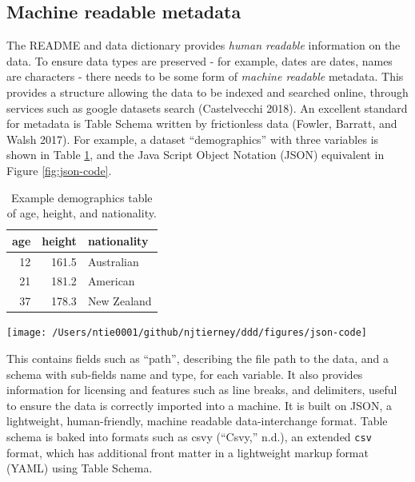 \documentclass[
]{article}
\let\origfigure\figure
\let\endorigfigure\endfigure
\renewenvironment{figure}[1][2] {
    \expandafter\origfigure\expandafter[H]
} {
    \endorigfigure
}
\begin{document}
\hypertarget{machine-metadata}{%
\subsection{Machine readable metadata}\label{machine-metadata}}

The README and data dictionary provides \emph{human readable} information on the data. To ensure data types are preserved - for example, dates are dates, names are characters - there needs to be some form of \emph{machine readable} metadata. This provides a structure allowing the data to be indexed and searched online, through services such as google datasets search (Castelvecchi 2018). An excellent standard for metadata is Table Schema written by frictionless data (Fowler, Barratt, and Walsh 2017). For example, a dataset ``demographics'' with three variables is shown in Table \ref{tab:table-machine-readable}, and the Java Script Object Notation (JSON) equivalent in Figure \ref{fig:json-code}.

\begin{table}[!h]

\caption{\label{tab:table-machine-readable}Example demographics table of age, height, and nationality.}
\centering
\begin{tabular}[t]{rrl}
\toprule
age & height & nationality\\
\midrule
12 & 161.5 & Australian\\
21 & 181.2 & American\\
37 & 178.3 & New Zealand\\
\bottomrule
\end{tabular}
\end{table}

\begin{figure}

{\centering \texttt{[image: /Users/ntie0001/github/njtierney/ddd/figures/json-code]} 

}

\caption{Example snippet of some Table Schema data for a dataset with three variables. This provides a description of each field, and the type of field.}\label{fig:json-code}
\end{figure}

This contains fields such as ``path'', describing the file path to the data, and a schema with sub-fields name and type, for each variable. It also provides information for licensing and features such as line breaks, and delimiters, useful to ensure the data is correctly imported into a machine. It is built on JSON, a lightweight, human-friendly, machine readable data-interchange format. Table schema is baked into formats such as csvy (``Csvy,'' n.d.), an extended \texttt{csv} format, which has additional front matter in a lightweight markup format (YAML) using Table Schema.
\end{document}
